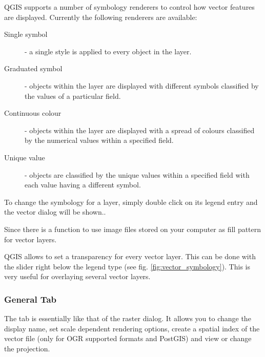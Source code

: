 QGIS supports a number of symbology renderers to control how
vector features are displayed. Currently the following renderers
are available:

\begin{description}
    \item[Single symbol] - a single style is applied to every
    object in the layer.
    \item[Graduated symbol] - objects within the layer are
    displayed with different symbols classified by the values of a
    particular field.
    \item[Continuous colour] - objects within the layer are
    displayed with a spread of colours classified by the numerical
    values within a specified field.
    \item[Unique value] - objects are classified by the unique
    values within a specified field with each value having a
    different symbol.
\end{description}

To change the symbology for a layer, simply double click on its legend 
entry and the vector  dialog will be 
shown..


Since  there is a function to use image files stored on 
your computer as fill pattern for vector layers.

 \label{sec:vect_transparency} 
QGIS \CURRENT allows to set a transparency for every vector layer. This can be done with
the slider right below the legend type (see fig. \ref{fig:vector_symbology}).
This is very useful for overlaying several vector layers.

\subsubsection{General Tab}
The  tab is essentially like that of the raster dialog. It allows you
to change the display name, set scale dependent rendering options, create a spatial 
index of the vector file (only for OGR supported formats and PostGIS) and view or
change the projection.

